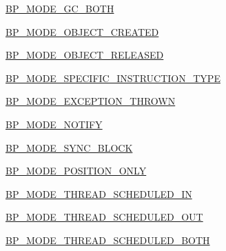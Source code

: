 \begin{DoxyCompactItemize}
\item 
\hyperlink{enumgov_1_1nasa_1_1jpf_1_1inspector_1_1server_1_1breakpoints_1_1_break_point_modes_a028a0e83f407e49fd23f69a830c270dc}{B\+P\+\_\+\+M\+O\+D\+E\+\_\+\+G\+C\+\_\+\+B\+O\+TH}
\item 
\hyperlink{enumgov_1_1nasa_1_1jpf_1_1inspector_1_1server_1_1breakpoints_1_1_break_point_modes_acf945b47904bf36be011a5f26bea0cd2}{B\+P\+\_\+\+M\+O\+D\+E\+\_\+\+O\+B\+J\+E\+C\+T\+\_\+\+C\+R\+E\+A\+T\+ED}
\item 
\hyperlink{enumgov_1_1nasa_1_1jpf_1_1inspector_1_1server_1_1breakpoints_1_1_break_point_modes_a879e60ef7f08939369f421bd93691896}{B\+P\+\_\+\+M\+O\+D\+E\+\_\+\+O\+B\+J\+E\+C\+T\+\_\+\+R\+E\+L\+E\+A\+S\+ED}
\item 
\hyperlink{enumgov_1_1nasa_1_1jpf_1_1inspector_1_1server_1_1breakpoints_1_1_break_point_modes_a2f9cbd9ee2459414f4397d90b6c00ae1}{B\+P\+\_\+\+M\+O\+D\+E\+\_\+\+S\+P\+E\+C\+I\+F\+I\+C\+\_\+\+I\+N\+S\+T\+R\+U\+C\+T\+I\+O\+N\+\_\+\+T\+Y\+PE}
\item 
\hyperlink{enumgov_1_1nasa_1_1jpf_1_1inspector_1_1server_1_1breakpoints_1_1_break_point_modes_aa42126e9bb571bee7f005c960aa4d7f4}{B\+P\+\_\+\+M\+O\+D\+E\+\_\+\+E\+X\+C\+E\+P\+T\+I\+O\+N\+\_\+\+T\+H\+R\+O\+WN}
\item 
\hyperlink{enumgov_1_1nasa_1_1jpf_1_1inspector_1_1server_1_1breakpoints_1_1_break_point_modes_a602e8515c33d2db33ff985b58f9be6c6}{B\+P\+\_\+\+M\+O\+D\+E\+\_\+\+N\+O\+T\+I\+FY}
\item 
\hyperlink{enumgov_1_1nasa_1_1jpf_1_1inspector_1_1server_1_1breakpoints_1_1_break_point_modes_a7560796855ec7b1d984f6b5e8e7ff751}{B\+P\+\_\+\+M\+O\+D\+E\+\_\+\+S\+Y\+N\+C\+\_\+\+B\+L\+O\+CK}
\item 
\hyperlink{enumgov_1_1nasa_1_1jpf_1_1inspector_1_1server_1_1breakpoints_1_1_break_point_modes_a935bf93fd2862e08c8aecd38dda3647e}{B\+P\+\_\+\+M\+O\+D\+E\+\_\+\+P\+O\+S\+I\+T\+I\+O\+N\+\_\+\+O\+N\+LY}
\item 
\hyperlink{enumgov_1_1nasa_1_1jpf_1_1inspector_1_1server_1_1breakpoints_1_1_break_point_modes_a3092604dadf48fb7ebceb8f285ad3b96}{B\+P\+\_\+\+M\+O\+D\+E\+\_\+\+T\+H\+R\+E\+A\+D\+\_\+\+S\+C\+H\+E\+D\+U\+L\+E\+D\+\_\+\+IN}
\item 
\hyperlink{enumgov_1_1nasa_1_1jpf_1_1inspector_1_1server_1_1breakpoints_1_1_break_point_modes_a4e3f6dfc4adda114b696bf86f0be1ae2}{B\+P\+\_\+\+M\+O\+D\+E\+\_\+\+T\+H\+R\+E\+A\+D\+\_\+\+S\+C\+H\+E\+D\+U\+L\+E\+D\+\_\+\+O\+UT}
\item 
\hyperlink{enumgov_1_1nasa_1_1jpf_1_1inspector_1_1server_1_1breakpoints_1_1_break_point_modes_a2cce1df014d496c660ff425aa45d24de}{B\+P\+\_\+\+M\+O\+D\+E\+\_\+\+T\+H\+R\+E\+A\+D\+\_\+\+S\+C\+H\+E\+D\+U\+L\+E\+D\+\_\+\+B\+O\+TH}

\end{DoxyCompactItemize}
